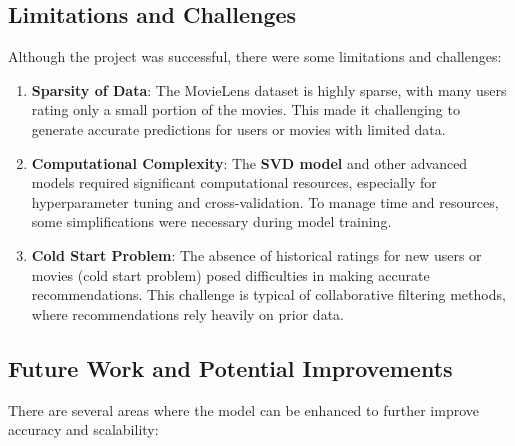 \documentclass[
]{article}
\begin{document}
\subsection{Limitations and
Challenges}\label{limitations-and-challenges}

Although the project was successful, there were some limitations and
challenges:

\begin{enumerate}
\def\labelenumi{\arabic{enumi}.}
\item
  \textbf{Sparsity of Data}: The MovieLens dataset is highly sparse,
  with many users rating only a small portion of the movies. This made
  it challenging to generate accurate predictions for users or movies
  with limited data.
\item
  \textbf{Computational Complexity}: The \textbf{SVD model} and other
  advanced models required significant computational resources,
  especially for hyperparameter tuning and cross-validation. To manage
  time and resources, some simplifications were necessary during model
  training.
\item
  \textbf{Cold Start Problem}: The absence of historical ratings for new
  users or movies (cold start problem) posed difficulties in making
  accurate recommendations. This challenge is typical of collaborative
  filtering methods, where recommendations rely heavily on prior data.
\end{enumerate}

\subsection{Future Work and Potential
Improvements}\label{future-work-and-potential-improvements}

There are several areas where the model can be enhanced to further
improve accuracy and scalability:
\end{document}
